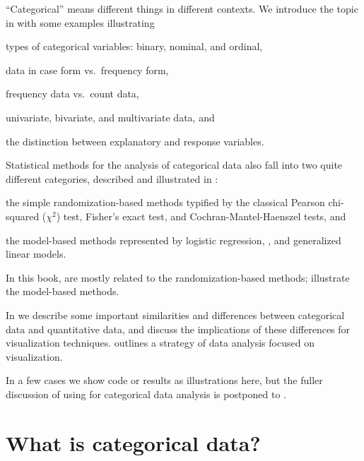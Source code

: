 \documentclass[10pt,krantz2]{krantz}\usepackage[]{graphicx}\usepackage[]{color}
\begin{document}
``Categorical'' means different things in different
contexts.  We introduce the topic in 
with some examples illustrating
\begin{seriate}
\item types of categorical variables: binary, nominal, and ordinal,
\item data in case form vs.\ frequency form,
\item frequency data vs.\ count data,
\item univariate, bivariate, and multivariate data, and
\item the distinction between explanatory and response variables.
\end{seriate}

Statistical methods for the analysis of categorical data also fall into two
quite different categories, described and illustrated in :
\begin{seriate}
\item the simple randomization-based
methods typified by
the classical Pearson chi-squared ($\chi^2$) test, Fisher's exact test, 
and Cochran-Mantel-Haenszel
tests, and
\item the model-based methods represented by
logistic regression, \loglin, and generalized linear models.
\end{seriate}
In this book, 
are mostly related to the randomization-based methods;
illustrate the model-based methods.

In  we describe some important similarities
and
differences between categorical data and
quantitative data, and discuss the implications of these differences for
visualization techniques.
 outlines a strategy of data analysis
focused on visualization.

In a few cases we show \R code or results as illustrations here,
but the fuller discussion of using \R for categorical data
analysis is postponed to .


\section{What is categorical data?}\label{sec:whatis}
\end{document}
